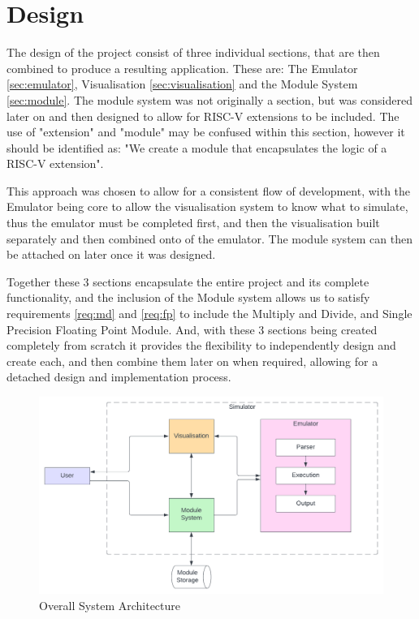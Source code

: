 

\chapter{Design}
\label{ch:design}
The design of the project consist of three individual sections, that are then combined to produce a resulting application. These are: The Emulator \ref{sec:emulator}, Visualisation \ref{sec:visualisation} and the Module System \ref{sec:module}. The module system was not originally a section, but was considered later on and then designed to allow for RISC-V extensions to be included. The use of "extension" and "module" may be confused within this section, however it should be identified as: "We create a module that encapsulates the logic of a RISC-V extension".

This approach was chosen to allow for a consistent flow of development, with the Emulator being core to allow the visualisation system to know what to simulate, thus the emulator must be completed first, and then the visualisation built separately and then combined onto of the emulator. The module system can then be attached on later once it was designed. 

Together these 3 sections encapsulate the entire project and its complete functionality, and the inclusion of the Module system allows us to satisfy requirements \ref{req:md} and \ref{req:fp} to include the Multiply and Divide, and Single Precision Floating Point Module. And, with these 3 sections being created completely from scratch it provides the flexibility to independently design and create each, and then combine them later on when required, allowing for a detached design and implementation process.

\begin{figure}[h]
    \centering
    \includegraphics[width=0.95\linewidth]{dissertation/DATA/sys architecture.png}
    \caption{Overall System Architecture}
    \label{fig:sys_architecture}
\end{figure}

